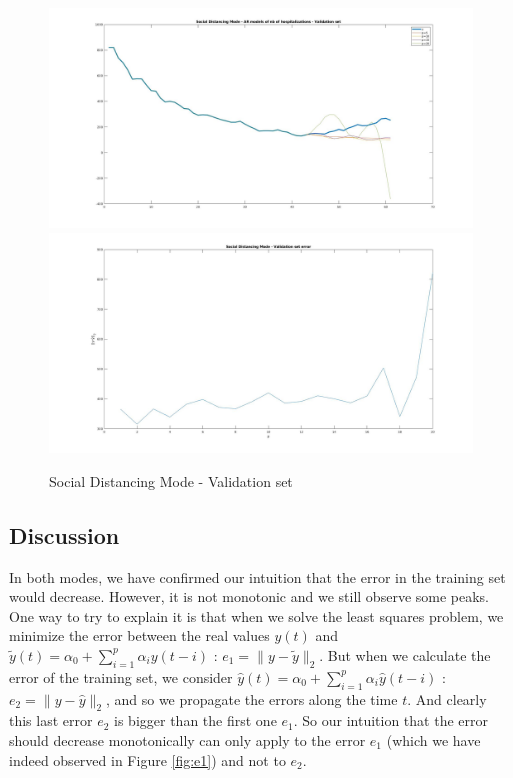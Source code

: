 \documentclass[11pt]{article}
\begin{document}
\begin{figure}[h!]
\centering
\includegraphics[scale=0.3]{SD_val.jpg}
\includegraphics[scale=0.3]{SD_Err_Val.jpg}
\caption{Social Distancing Mode - Validation set}
\label{fig:SD_val}
\end{figure}
\subsection*{Discussion}

In both modes, we have confirmed our intuition that the error in the training set would decrease. However, it is not monotonic and we still observe some peaks. One way to try to explain it is that when we solve the least squares problem, we minimize the error between the real values $y(t)$ and $\tilde{y}(t) = \alpha_0 + \sum_{i=1}^p \alpha_iy(t-i)$ : $e_1 = \| y-\tilde{y}\|_2$. But when we calculate the error of the training set, we consider $\hat{y}(t) = \alpha_0 + \sum_{i=1}^p \alpha_i \hat{y}(t-i)$ : $e_2 = \| y-\hat{y}\|_2$, and so we propagate the errors along the time $t$. And clearly this last error $e_2$ is bigger than the first one $e_1$. So our intuition that the error should decrease monotonically can only apply to the error $e_1$ (which we have indeed observed in Figure \ref{fig:e1}) and not to $e_2$.
\end{document}
